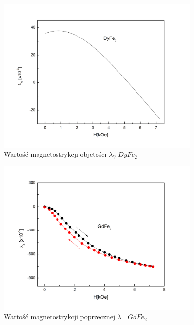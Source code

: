 \documentclass[a4paper,12pt]{article}
\numberwithin{equation}{section}
\begin{document}
\begin{figure}[h]
    \centering
    \includegraphics[width =0.9\textwidth]{../img/magneto/DyObjetosc}
    \caption{Wartość magnetostrykcji objetości $\lambda_{V}$ $DyFe_2$}
    \label{DyObjetosc}
\end{figure}





\begin{figure}[h]
    \centering
    \includegraphics[width =0.9\textwidth]{../img/magneto/Gdpoprzeczna}
    \caption{Wartość magnetostrykcji poprzecznej $\lambda_{\perp}$ $GdFe_2$}
    \label{Gdpoprzeczna}
\end{figure}
\end{document}
